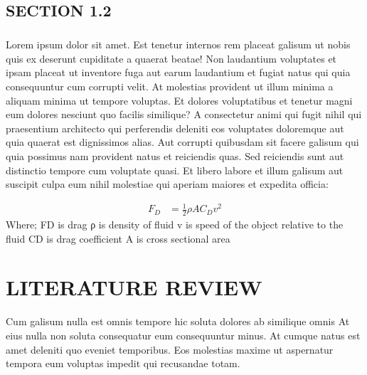\documentclass[a4paper,12pt]{report}
\begin{document}
\section{SECTION 1.2}
\paragraph{}
\par Lorem ipsum dolor sit amet. Est tenetur internos rem placeat galisum ut nobis quis ex deserunt cupiditate a quaerat beatae! Non laudantium voluptates et ipsam placeat ut inventore fuga aut earum laudantium et fugiat natus qui quia consequuntur cum corrupti velit. At molestias provident ut illum minima a aliquam minima ut tempore voluptas. Et dolores voluptatibus et tenetur magni eum dolores nesciunt quo facilis similique? A consectetur animi qui fugit nihil qui praesentium architecto qui perferendis deleniti eos voluptates doloremque aut quia quaerat est dignissimos alias. Aut corrupti quibusdam sit facere galisum qui quia possimus nam provident natus et reiciendis quas. Sed reiciendis sunt aut distinctio tempore cum voluptate quasi. Et libero labore et illum galisum aut suscipit culpa eum nihil molestiae qui aperiam maiores et expedita officia:

\begin{equation}
\begin{split}
F_D & = \frac{1}{2}\rho A C_D v^2 
 \end{split}
\end{equation}
Where; \hfill \break
FD is drag \hfill \break
ρ is density of fluid \hfill \break
v is speed of the object relative to the fluid \hfill \break
CD is drag coefficient \hfill \break
A is cross sectional area 


\chapter{LITERATURE REVIEW}
\hspace{.5cm}Cum galisum nulla est omnis tempore hic soluta dolores ab similique omnis At eius nulla non soluta consequatur eum consequuntur minus. At cumque natus est amet deleniti quo eveniet temporibus. Eos molestias maxime ut aspernatur tempora eum voluptas impedit qui recusandae totam.
\end{document}
